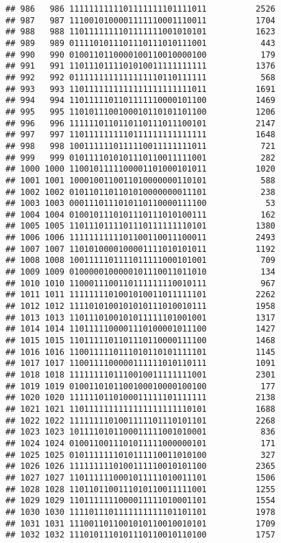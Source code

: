 \documentclass[]{article}
\begin{document}
\begin{verbatim}
## 986   986 1111111111101111111101111011          2526
## 987   987 1110010100001111110001110011          1704
## 988   988 1101111111101111111001010101          1623
## 989   989 0111101011101110111010111001           443
## 990   990 0100110110000100110010000100           179
## 991   991 1101110111101010011111111111          1376
## 992   992 0111111111111111110110111111           568
## 993   993 1101111111111111111111111011          1691
## 994   994 1101111101101111110000101100          1469
## 995   995 1101011100100010110101101100          1206
## 996   996 1111110110110110111011100101          2147
## 997   997 1101111111110111111111111111          1648
## 998   998 1001111110111110011111111011           721
## 999   999 0101111010101110110011111001           282
## 1000 1000 1100101111100001101000101011          1020
## 1001 1001 1000100110011010000000110101           588
## 1002 1002 0101101101101010000000011101           238
## 1003 1003 0001110111010110110000111100            53
## 1004 1004 0100101110101110111010100111           162
## 1005 1005 1101110111101110111111110101          1380
## 1006 1006 1111111111101100110011100011          2493
## 1007 1007 1101010000100001111010101011          1192
## 1008 1008 1001111101111011111000101001           709
## 1009 1009 0100000100000101110011011010           134
## 1010 1010 1100011100110111111110010111           967
## 1011 1011 1111111101001010011011111101          2262
## 1012 1012 1111010100101010111010010111          1958
## 1013 1013 1101110100101011111101001001          1317
## 1014 1014 1101111100001110100001011100          1427
## 1015 1015 1101111101101110110000111100          1468
## 1016 1016 1100111110111010110101111101          1145
## 1017 1017 1100111100000111111010110111          1091
## 1018 1018 1111111101110010011111111001          2301
## 1019 1019 0100110101100100010000100100           177
## 1020 1020 1111110110100011111101111111          2138
## 1021 1021 1101111111111111111111110101          1688
## 1022 1022 1111111101001111101110101101          2268
## 1023 1023 1011110101100011111001010001           836
## 1024 1024 0100110011101011111000000101           171
## 1025 1025 0101111111010111110011010100           327
## 1026 1026 1111111110100111110010101100          2365
## 1027 1027 1101111110001011111010011101          1506
## 1028 1028 1101101100111010110011111001          1255
## 1029 1029 1101111111000011111010001101          1554
## 1030 1030 1111011101111111111101101101          1978
## 1031 1031 1110011011001010110010010101          1709
## 1032 1032 1110101110101110110010110100          1757

\end{verbatim}
\end{document}
